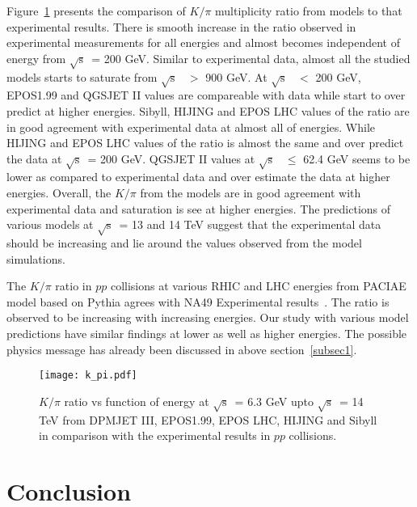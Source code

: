 \documentclass{article}
\newcommand{\sqrts}{\mbox{$\sqrt{\mathrm{s}}$}}
\begin{document}
Figure~\ref{fig3} presents the comparison of $K/\pi$ multiplicity ratio from models to that experimental results. There is smooth increase in the ratio observed in experimental measurements for all energies and almost becomes independent of energy from \sqrts~= 200 GeV. Similar to experimental data, almost all the studied models starts to saturate from \sqrts~ $>$ 900 GeV. At \sqrts~ $<$ 200 GeV, EPOS1.99 and QGSJET II values are compareable with data while start to over predict at higher energies. Sibyll, HIJING and EPOS LHC values of the ratio are in good agreement with experimental data at almost all of energies. While HIJING and EPOS LHC values of the ratio is almost the same and over predict the data at \sqrts~= 200 GeV. QGSJET II values at \sqrts~ $\le$ 62.4 GeV seems to be lower as compared to experimental data and over estimate the data at higher energies. Overall, the $K/\pi$ from the models are in good agreement with experimental data and saturation is see at higher energies. The predictions of various models at \sqrts~= 13 and 14 TeV suggest that the experimental data should be increasing and lie around the values observed from the model simulations.         


The $K/\pi$ ratio in $pp$ collisions at various RHIC and LHC energies from PACIAE model based on Pythia agrees with NA49 Experimental results~\cite{Long:2011tk}. The ratio is observed to be increasing with increasing energies. Our study with various model predictions have similar findings at lower as well as higher energies. The possible physics message has already been discussed in above section~\ref{subsec1}.  



\begin{figure}[ht!]
\begin{center}
\texttt{[image: k\_pi.pdf]}
\caption{$K/\pi$ ratio vs function of energy at \sqrts~= 6.3 GeV upto \sqrts~= 14 TeV from DPMJET III, EPOS1.99, EPOS LHC, HIJING and Sibyll in comparison with the experimental results in $pp$ collisions.}
\label{fig3}
\end{center}
\end{figure}



\section{Conclusion}\label{sec4}
\end{document}
